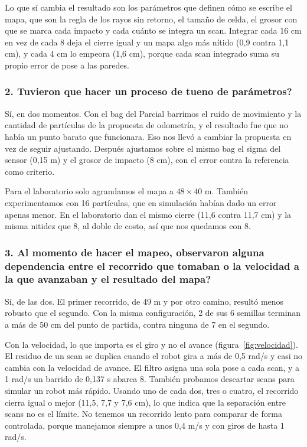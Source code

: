 Lo que sí cambia el resultado son los parámetros que definen cómo se escribe el
mapa, que son la regla de los rayos sin retorno, el tamaño de celda, el grosor
con que se marca cada impacto y cada cuánto se integra un scan. Integrar cada
16 cm en vez de cada 8 deja el cierre igual y un mapa algo más nítido (0,9
contra 1,1 cm), y cada 4 cm lo empeora (1,6 cm), porque cada scan integrado
suma su propio error de pose a las paredes.

\subsubsection*{2. \textquestiondown{}Tuvieron que hacer un proceso de tueno de parámetros?}

Sí, en dos momentos. Con el bag del Parcial barrimos el ruido de movimiento y
la cantidad de partículas de la propuesta de odometría, y el resultado fue que
no había un punto barato que funcionara. Eso nos llevó a cambiar la propuesta
en vez de seguir ajustando. Después ajustamos sobre el mismo bag el sigma del
sensor (0,15 m) y el grosor de impacto (8 cm), con el error contra la
referencia como criterio.

Para el laboratorio solo agrandamos el mapa a $48 \times 40$ m. También
experimentamos con 16 partículas, que en simulación habían dado un error apenas
menor. En el laboratorio dan el mismo cierre (11,6 contra 11,7 cm) y la misma
nitidez que 8, al doble de costo, así que nos quedamos con 8.

\subsubsection*{3. \textquestiondown{}Al momento de hacer el mapeo, observaron alguna dependencia entre el recorrido que tomaban o la velocidad a la que avanzaban y el resultado del mapa?}

Sí, de las dos. El primer recorrido, de 49 m y por otro camino, resultó menos
robusto que el segundo. Con la misma configuración, 2 de sus 6 semillas
terminan a más de 50 cm del punto de partida, contra ninguna de 7 en el
segundo.

Con la velocidad, lo que importa es el giro y no el avance
(figura~\ref{fig:velocidad}). El residuo de un scan se duplica cuando el robot
gira a más de 0,5 rad/s y casi no cambia con la velocidad de avance. El filtro
asigna una sola pose a cada scan, y a 1 rad/s un barrido de 0,137 s abarca
8\textdegree. También probamos descartar scans para simular un robot más
rápido. Usando uno de cada dos, tres o cuatro, el recorrido cierra igual o
mejor (11,5, 7,7 y 7,6 cm), lo que indica que la separación entre scans no es
el límite. No tenemos un recorrido lento para comparar de forma controlada, porque
manejamos siempre a unos 0,4 m/s y con giros de hasta 1 rad/s.

